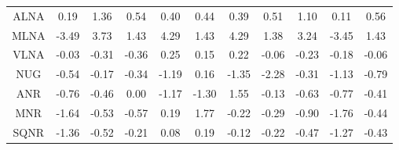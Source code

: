 \documentclass[11pt,a4paper]{report}
\begin{document}
\begin{longtable}{ | c || c | c | c | c | c | c | c | c | c || c |}
ALNA &  \cellcolor[HTML]{F7F7FF} 0.19 &  \cellcolor[HTML]{DFDFFF} 1.36 &  \cellcolor[HTML]{EFEFFF} 0.54 &  \cellcolor[HTML]{F7F7FF} 0.40 &  \cellcolor[HTML]{F7F7FF} 0.44 &  \cellcolor[HTML]{F7F7FF} 0.39 &  \cellcolor[HTML]{EFEFFF} 0.51 &  \cellcolor[HTML]{E7E7FF} 1.10 &  \cellcolor[HTML]{FFFFFF} 0.11 &  \cellcolor[HTML]{EFEFFF} 0.56 \\
MLNA &  \cellcolor[HTML]{FFA7A7} -3.49 &  \cellcolor[HTML]{9F9FFF} 3.73 &  \cellcolor[HTML]{DFDFFF} 1.43 &  \cellcolor[HTML]{8F8FFF} 4.29 &  \cellcolor[HTML]{DFDFFF} 1.43 &  \cellcolor[HTML]{9797FF} 4.29 &  \cellcolor[HTML]{DFDFFF} 1.38 &  \cellcolor[HTML]{AFAFFF} 3.24 &  \cellcolor[HTML]{FFA7A7} -3.45 &  \cellcolor[HTML]{DFDFFF} 1.43 \\
VLNA &  \cellcolor[HTML]{FFFFFF} -0.03 &  \cellcolor[HTML]{FFF7F7} -0.31 &  \cellcolor[HTML]{FFF7F7} -0.36 &  \cellcolor[HTML]{F7F7FF} 0.25 &  \cellcolor[HTML]{FFFFFF} 0.15 &  \cellcolor[HTML]{F7F7FF} 0.22 &  \cellcolor[HTML]{FFFFFF} -0.06 &  \cellcolor[HTML]{FFF7F7} -0.23 &  \cellcolor[HTML]{FFF7F7} -0.18 &  \cellcolor[HTML]{FFFFFF} -0.06 \\
NUG &  \cellcolor[HTML]{FFEFEF} -0.54 &  \cellcolor[HTML]{FFF7F7} -0.17 &  \cellcolor[HTML]{FFF7F7} -0.34 &  \cellcolor[HTML]{FFDFDF} -1.19 &  \cellcolor[HTML]{F7F7FF} 0.16 &  \cellcolor[HTML]{FFDFDF} -1.35 &  \cellcolor[HTML]{FFC7C7} -2.28 &  \cellcolor[HTML]{FFF7F7} -0.31 &  \cellcolor[HTML]{FFDFDF} -1.13 &  \cellcolor[HTML]{FFE7E7} -0.79 \\
ANR &  \cellcolor[HTML]{FFEFEF} -0.76 &  \cellcolor[HTML]{FFF7F7} -0.46 &  \cellcolor[HTML]{FFFFFF} 0.00 &  \cellcolor[HTML]{FFDFDF} -1.17 &  \cellcolor[HTML]{FFDFDF} -1.30 &  \cellcolor[HTML]{D7D7FF} 1.55 &  \cellcolor[HTML]{FFFFFF} -0.13 &  \cellcolor[HTML]{FFEFEF} -0.63 &  \cellcolor[HTML]{FFEFEF} -0.77 &  \cellcolor[HTML]{FFF7F7} -0.41 \\
MNR &  \cellcolor[HTML]{FFD7D7} -1.64 &  \cellcolor[HTML]{FFEFEF} -0.53 &  \cellcolor[HTML]{FFEFEF} -0.57 &  \cellcolor[HTML]{F7F7FF} 0.19 &  \cellcolor[HTML]{CFCFFF} 1.77 &  \cellcolor[HTML]{FFF7F7} -0.22 &  \cellcolor[HTML]{FFF7F7} -0.29 &  \cellcolor[HTML]{FFE7E7} -0.90 &  \cellcolor[HTML]{FFCFCF} -1.76 &  \cellcolor[HTML]{FFF7F7} -0.44 \\
SQNR &  \cellcolor[HTML]{FFDFDF} -1.36 &  \cellcolor[HTML]{FFEFEF} -0.52 &  \cellcolor[HTML]{FFF7F7} -0.21 &  \cellcolor[HTML]{FFFFFF} 0.08 &  \cellcolor[HTML]{F7F7FF} 0.19 &  \cellcolor[HTML]{FFFFFF} -0.12 &  \cellcolor[HTML]{FFF7F7} -0.22 &  \cellcolor[HTML]{FFF7F7} -0.47 &  \cellcolor[HTML]{FFDFDF} -1.27 &  \cellcolor[HTML]{FFF7F7} -0.43 \\

\end{longtable}
\end{document}
